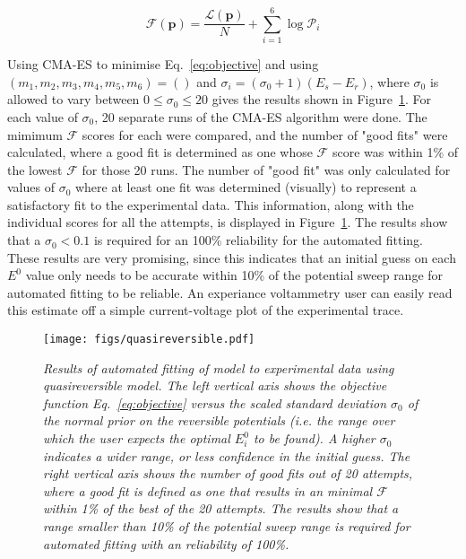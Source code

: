 \documentclass[a4paper, 12pt]{article}
\begin{document}
\begin{equation}\label{eq:objective}
    \mathcal{F}(\mathbf{p}) =  \frac{\mathcal{L}(\mathbf{p})}{N} + 
    \sum_{i=1}^6 \log \mathcal{P}_i
\end{equation}

Using CMA-ES to minimise Eq.~\ref{eq:objective} and using
$(m_1,m_2,m_3,m_4,m_5,m_6) = ()$ and $\sigma_i = (\sigma_0+1)(E_s-E_r)$, where
$\sigma_0$ is allowed to vary between $0 \le \sigma_0 \le 20$ gives the results
shown in Figure~\ref{fig:quasi_results}. For each value of $\sigma_0$, 20 separate
runs of the CMA-ES algorithm were done. The mimimum $\mathcal{F}$ scores for
each were compared, and the number of "good fits" were calculated, where a good
fit is determined as one whose $\mathcal{F}$ score was within 1\% of the lowest
$\mathcal{F}$ for those 20 runs. The number of "good fit" was only calculated for 
values of $\sigma_0$ where at least one fit was determined (visually) to represent 
a satisfactory fit to the experimental data. This information, along with the individual
scores for all the attempts, is displayed in Figure~\ref{fig:quasi_results}. The
results show that a $\sigma_0 < 0.1$ is required for an 100\% reliability for the
automated fitting. These results are very promising, since this indicates that
an initial guess on each $E^0$ value only needs to be accurate within 10\% of
the potential sweep range for automated fitting to be reliable. An experiance
voltammetry user can easily read this estimate off a simple current-voltage plot
of the experimental trace.

\begin{figure}[htbp]
\texttt{[image: figs/quasireversible.pdf]}
    \caption{\it{Results of automated fitting of model to experimental data
    using quasireversible model. The left vertical axis shows the objective
    function Eq.~\ref{eq:objective} versus the scaled standard deviation
    $\sigma_0$ of the normal prior on the reversible potentials (i.e. the range
    over which the user expects the optimal $E^0_i$ to be found). A higher
    $\sigma_0$ indicates a wider range, or less confidence in the initial guess.
    The right vertical axis shows the number of good fits out of 20 attempts,
    where a good fit is defined as one that results in an minimal $\mathcal{F}$
    within 1\% of the best of the 20 attempts. The results show that a range
    smaller than 10\% of the potential sweep range is required for
    automated fitting with an reliability of 100\%.}}
    \label{fig:quasi_results}
\end{figure}
\end{document}
